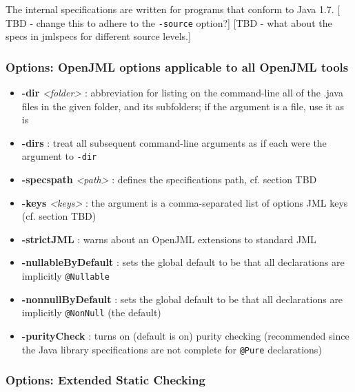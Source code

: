 The internal specifications are written for programs that conform to Java 1.7.  [ TBD - change this to adhere to the {\tt -source} option?] 
[TBD - what about the specs in jmlspecs for different source levels.]

\subsubsection{Options: OpenJML options applicable to all OpenJML tools }
\label{OptionsJML}

\begin{itemize}
\item \textbf{-dir} \textit{<folder>} : abbreviation for listing on the command-line all of the .java files in the given folder, and its subfolders; if the argument is a file, use it as is
\item \textbf{-dirs} : treat all subsequent command-line arguments as if each were the argument to \texttt{-dir}
\item \textbf{-specspath} \textit{<path>} : defines the specifications path, cf. section TBD
\item \textbf{-keys} \textit{<keys>} : the argument is a comma-separated list of options JML keys (cf. section TBD)
\item \textbf{-strictJML} : warns about an OpenJML extensions to standard JML
\end{itemize}

\begin{itemize}
\item \textbf{-nullableByDefault} : sets the global default to be that all declarations are implicitly \texttt{@Nullable}
\item \textbf{-nonnullByDefault} : sets the global default to be that all 
declarations are implicitly \texttt{@NonNull} (the default)
\item \textbf{-purityCheck} : turns on (default is on) purity checking (recommended since the Java library specifications are not complete for \texttt{@Pure} declarations)
\end{itemize}

\subsubsection{Options: Extended Static Checking}
\label{OptionsESC}

